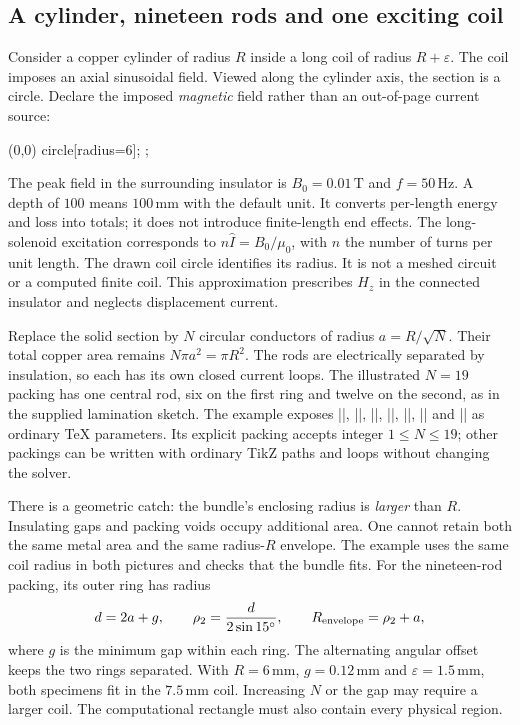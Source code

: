\subsection{A cylinder, nineteen rods and one exciting coil}
Consider a copper cylinder of radius $R$ inside a long coil of radius
$R+\varepsilon$. The coil imposes an axial sinusoidal field. Viewed along the
cylinder axis, the section is a circle. Declare the imposed \emph{magnetic}
field rather than an out-of-page current source:
\begin{codeexample}
\filldraw[fill=gray!25,
  femm/region={material=copper,mesh size=.24,curve tolerance=.002}]
  (0,0) circle[radius=6];
;
\end{codeexample}
The peak field in the surrounding insulator is $B_0=0.01\,\mathrm T$ and
$f=50\,\mathrm{Hz}$. A depth of $100$ means $100\,\mathrm{mm}$ with the default
unit. It converts per-length energy and loss into totals; it does not introduce
finite-length end effects. The long-solenoid excitation corresponds to
$n\widehat I=B_0/\mu_0$, with $n$ the number of turns per unit length.
The drawn coil circle identifies its radius. It is not a meshed circuit or a
computed finite coil. This approximation prescribes $H_z$ in the connected
insulator and neglects displacement current.

Replace the solid section by $N$ circular conductors of radius
$a=R/\sqrt N$. Their total copper area remains
$N\pi a^2=\pi R^2$. The rods are electrically separated by insulation, so each
has its own closed current loops. The illustrated $N=19$ packing has one
central rod, six on the first ring and twelve on the second, as in the supplied
lamination sketch. The example exposes |\Radius|, |\Strands|, |\Gap|,
|\Epsilon|, |\Frequency|, |\AppliedB| and |\Length| as ordinary TeX parameters.
Its explicit packing accepts integer $1\leq N\leq19$; other packings can be
written with ordinary TikZ paths and loops without changing the solver.

There is a geometric catch: the bundle's enclosing radius is \emph{larger}
than $R$. Insulating gaps and packing voids occupy additional area. One cannot
retain both the same metal area and the same radius-$R$ envelope. The example
uses the same coil radius in both pictures and checks that the bundle fits.
For the nineteen-rod packing, its outer ring has radius
\[
 d=2a+g,\qquad \rho_2=\frac{d}{2\sin15^\circ},\qquad
 R_{\rm envelope}=\rho_2+a,
\]
where $g$ is the minimum gap within each ring. The alternating angular offset
keeps the two rings separated. With $R=6\,\mathrm{mm}$, $g=0.12\,\mathrm{mm}$
and $\varepsilon=1.5\,\mathrm{mm}$, both specimens fit in the
$7.5\,\mathrm{mm}$ coil. Increasing $N$ or the gap may require a larger coil.
The computational rectangle must also contain every physical region.

